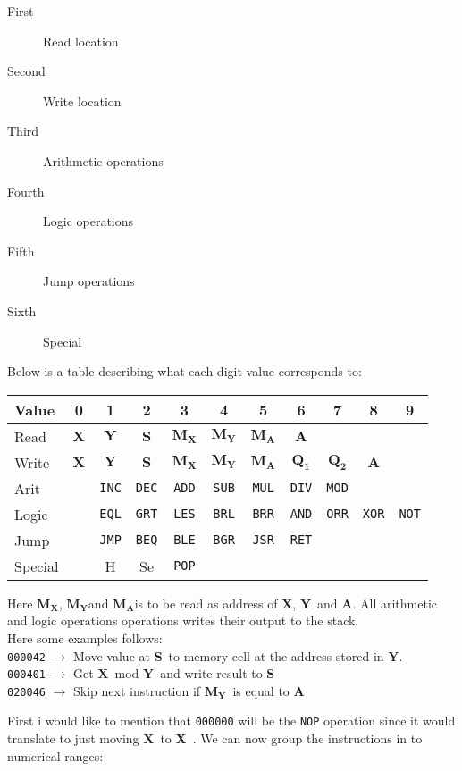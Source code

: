 \documentclass{article}
\newcommand{\x}{$\textbf{X}$}
\newcommand{\y}{$\textbf{Y}$}
\newcommand{\s}{$\textbf{S}$}
\newcommand{\A}{$\textbf{A}$}
\newcommand{\mx}{$\textbf{M}_{\textbf{X}}$}
\newcommand{\my}{$\textbf{M}_{\textbf{Y}}$}
\newcommand{\ma}{$\textbf{M}_{\textbf{A}}$}
\newcommand{\q}{$\textbf{Q}_{\textbf{1}}$}
\newcommand{\qq}{$\textbf{Q}_{\textbf{2}}$}
\newcommand{\V}{\verb}
\begin{document}
\begin{description}
  \item[First] Read location
  \item[Second] Write location
  \item[Third] Arithmetic operations
  \item[Fourth] Logic operations
  \item[Fifth] Jump operations
  \item[Sixth] Special
\end{description}
Below is a table describing what each digit value corresponds to:
\begin{center}
\begin{tabular}{l || *{10}{c |}}
Value & 0 & 1 & 2 & 3 & 4 & 5 & 6 & 7 & 8 & 9 \\
\hline
Read & \x & \y & \s  &\mx & \my & \ma & \A & & & \\

Write & \x & \y & \s  &\mx & \my & \ma & \q& \qq & \A &\\

Arit &  & \V+INC+ & \V+DEC+ & \V+ADD+ & \V+SUB+ & \V+MUL+ & \V+DIV+ & \V+MOD+  & 
&
\\

Logic &  &  \V+EQL+ & \V+GRT+ & \V+LES+ & \V+BRL+ & \V+BRR+ & \V+AND+ & \V+ORR+
& \V+XOR+ & \V+NOT+\\

Jump & & \V+JMP+ & \V+BEQ+ & \V+BLE+ & \V+BGR+ & \V+JSR+ & \V+RET+ & & & \\

Special & & H & Se & \V+POP+ &  &  &  &  &  &  \\	
\end{tabular}
\end{center}
Here \mx , \my and \ma is to be read as address of \x , \y \ and \A.  All
arithmetic and logic operations operations writes their output to the stack.\\
Here some examples follows:\\
\verb+000042+ $\rightarrow$ Move value at \s \ to memory cell at the address
stored in \y. \\
\verb+000401+ $\rightarrow$ Get \x \ mod \y \ and write result to \s \\
\verb+020046+ $\rightarrow$ Skip next instruction if \my \ is equal to \A \\
\newpage

First i would like to  mention that
\verb+000000+ will be the \verb+NOP+ operation since it would translate to just
moving \x \ to \x \ . 
We can now group the instructions in to numerical ranges:
\end{document}
